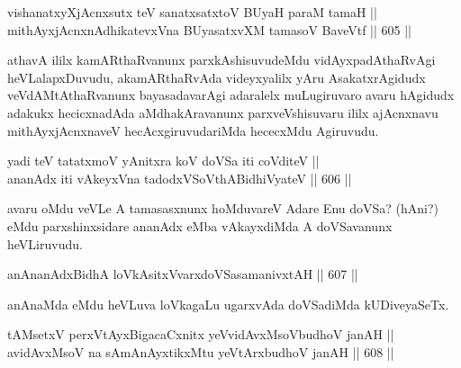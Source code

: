 \begin{shl}
vishanatxyXjAcnxsutx teV sanatxsatxtoV BUyaH paraM tamaH || \\
\footnotemark[1]mithAyxjAcnxnAdhikatevxVna BUyasatxvXM tamasoV BaveVtf \hfill || 605 ||  
\end{shl}

\begin{artha}
athavA ililx kamARthaRvanunx parxkAshisuvudeMdu vidAyxpadAthaRvAgi
heVLalapxDuvudu, akamARthaRvAda videyxyalilx yAru AsakatxrAgidudx
veVdAMtAthaRvanunx bayasadavarAgi adaralelx  muLugiruvaro avaru
hAgidudx adakukx hecicxnadAda aMdhakAravanunx parxveVshisuvaru ililx
ajAcnxnavu mithAyxjAcnxnaveV hecAcxgiruvudariMda hececxMdu Agiruvudu.
\end{artha}


\begin{shl}
yadi teV tatatxmoV yAnitxra koV doVSa iti coVditeV || \\
ananAdx iti vAkeyxVna tadodxVSoV\s thABidhiVyateV \hfill || 606 ||  
\end{shl}

\begin{artha}
avaru oMdu veVLe A tamasasxnunx hoMduvareV Adare Enu doVSa? (hAni?)
eMdu parxshinxsidare ananAdx eMba vAkayxdiMda A doVSavanunx heVLiruvudu.
\end{artha}

\begin{shl}
anAnanAdxBidhA loVkAsitxVvarxdoVSasamanivxtAH \hfill || 607 || 
\end{shl}

\begin{artha}
anAnaMda eMdu heVLuva loVkagaLu ugarxvAda doVSadiMda kUDiveyaSeTx.
\end{artha}

\begin{shl}
tAMsetxV perxVtAyxBigacaCxnitx yeV\s vidAvxMsoV\s budhoV janAH || \\
avidAvxMsoV na sAmAnAyxtikxMtu yeV\s tArxbudhoV janAH \hfill || 608 || 
\end{shl}

